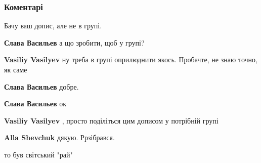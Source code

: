  
 
 
 
 
\subsubsection{Коментарі}
\label{sec:11_08_2021.fb.vasiljev_vasilij.dnepropetrovsk.1.zhittja_v_sssr.cmt}

\begin{itemize} %
Бачу ваш допис, але не в групі.

\begin{itemize} %
\textbf{Слава Васильев} а що зробити, щоб у групі?

\textbf{Vasiliy Vasilyev} ну треба в групі оприлюднити якось.
Пробачте, не знаю точно, як саме

\textbf{Слава Васильев} добре.

\textbf{Слава Васильев} ок

\textbf{Vasiliy Vasilyev} , просто поділіться цим дописом у потрібній групі

\textbf{Alla Shevchuk} дякую. Ррзібрався.
\end{itemize} %

то був світський "рай"

\end{itemize} %

